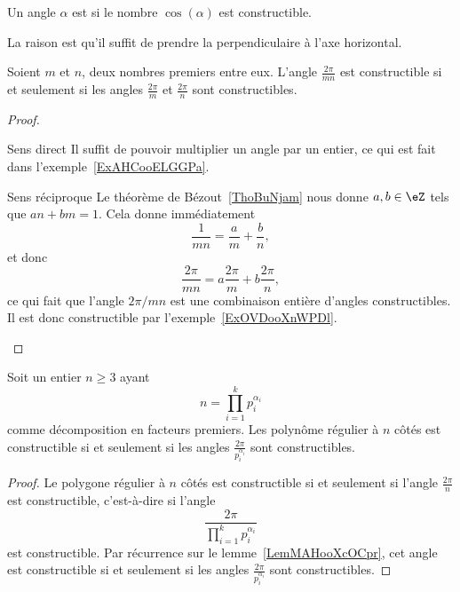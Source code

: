 \begin{definition}
	Un angle \( \alpha\) est  si le nombre \( \cos(\alpha)\) est constructible.
\end{definition}
La raison est qu'il suffit de prendre la perpendiculaire à l'axe horizontal.

\begin{lemma}   \label{LemMAHooXcOCpr}
	Soient \( m\) et \( n\), deux nombres premiers entre eux. L'angle \( \frac{ 2\pi }{ mn }\) est constructible si et seulement si les angles \( \frac{ 2\pi }{ m }\) et \( \frac{ 2\pi }{ n }\) sont constructibles.
\end{lemma}

\begin{proof}
	\begin{subproof}
		\item[Sens direct]
		Il suffit de pouvoir multiplier un angle par un entier, ce qui est fait dans l'exemple~\ref{ExAHCooELGGPa}.
		\item[Sens réciproque]
		Le théorème de Bézout~\ref{ThoBuNjam} nous donne \( a,b\in \eZ\) tels que \( an+bm=1\). Cela donne immédiatement
		\begin{equation}
			\frac{1}{ mn }=\frac{ a }{ m }+\frac{ b }{ n },
		\end{equation}
		et donc
		\begin{equation}
			\frac{ 2\pi }{ mn }=a\frac{ 2\pi }{ m }+b\frac{ 2\pi }{ n },
		\end{equation}
		ce qui fait que l'angle \( 2\pi/mn\) est une combinaison entière d'angles constructibles. Il est donc constructible par l'exemple~\ref{ExOVDooXnWPDl}.
	\end{subproof}
\end{proof}

\begin{lemma}   \label{LemUKNooSBzDyY}
	Soit un entier \( n\geq 3\) ayant
	\begin{equation}
		n=\prod_{i=1}^kp_i^{\alpha_i}
	\end{equation}
	comme décomposition en facteurs premiers. Les polynôme régulier à \( n\) côtés est constructible si et seulement si les angles \( \frac{ 2\pi }{ p_i^{\alpha_i} }\) sont constructibles.
\end{lemma}

\begin{proof}
	Le polygone régulier à \( n\) côtés est constructible si et seulement si l'angle \( \frac{ 2\pi }{ n }\) est constructible, c'est-à-dire si l'angle
	\begin{equation}
		\frac{ 2\pi }{ \prod_{i=1}^kp_i^{\alpha_i} }
	\end{equation}
	est constructible. Par récurrence sur le lemme~\ref{LemMAHooXcOCpr}, cet angle est constructible si et seulement si les angles \( \frac{ 2\pi }{ p_i^{\alpha_i} }\) sont constructibles.
\end{proof}

